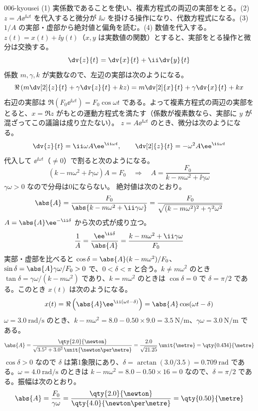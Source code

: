 \documentclass[uplatex,dvipdfmx,a4paper,11pt]{jsarticle}
\begin{document}
\begin{kaisetsu}{006-kyousei}
\houshin (1) 実係数であることを使い、複素方程式の両辺の実部をとる。(2) $z=A\ee^{\ii\omega t}$ を代入すると微分が $\ii\omega$ を掛ける操作になり、代数方程式になる。(3) $1/A$ の実部・虚部から絶対値と偏角を読む。(4) 数値を代入する。
\keisan {} $z(t)=x(t)+\ii y(t)$（$x,y$ は実数値の関数）とすると、実部をとる操作と微分は交換する。
\[ \dv{z}{t}=\dv{x}{t}+\ii\dv{y}{t} \]
係数 $m,\gamma,k$ が実数なので、左辺の実部は次のようになる。
\[ \Re\left(m\dv[2]{z}{t}+\gamma\dv{z}{t}+kz\right)=m\dv[2]{x}{t}+\gamma\dv{x}{t}+kx \]
右辺の実部は $\Re(F_{0}\ee^{\ii\omega t})=F_{0}\cos\omega t$ である。よって複素方程式の両辺の実部をとると、$x=\Re z$ がもとの運動方程式を満たす（係数が複素数なら、実部に $y$ が混ざってこの議論は成り立たない）。
 $z=A\ee^{\ii\omega t}$ のとき、微分は次のようになる。
\[ \dv{z}{t}=\ii\omega A\ee^{\ii\omega t},\qquad \dv[2]{z}{t}=-\omega^{2}A\ee^{\ii\omega t} \]
代入して $\ee^{\ii\omega t}$（$\neq0$）で割ると次のようになる。
\[ (k-m\omega^{2}+\ii\gamma\omega)A=F_{0}\quad\Longrightarrow\quad A=\frac{F_{0}}{k-m\omega^{2}+\ii\gamma\omega} \]
$\gamma\omega>0$ なので分母は0にならない。
 絶対値は次のとおり。
\[ \abs{A}=\frac{F_{0}}{\abs{k-m\omega^{2}+\ii\gamma\omega}}=\frac{F_{0}}{\sqrt{(k-m\omega^{2})^{2}+\gamma^{2}\omega^{2}}} \]
$A=\abs{A}\ee^{-\ii\delta}$ から次の式が成り立つ。
\[ \frac{1}{A}=\frac{\ee^{\ii\delta}}{\abs{A}}=\frac{k-m\omega^{2}+\ii\gamma\omega}{F_{0}} \]
実部・虚部を比べると $\cos\delta=\abs{A}(k-m\omega^{2})/F_{0}$、$\sin\delta=\abs{A}\gamma\omega/F_{0}>0$ で、$0<\delta<\pi$ と合う。$k\neq m\omega^{2}$ のとき $\tan\delta=\gamma\omega/(k-m\omega^{2})$ であり、$k=m\omega^{2}$ のときは $\cos\delta=0$ で $\delta=\pi/2$ である。このとき $x(t)$ は次のようになる。
\[ x(t)=\Re\left(\abs{A}\ee^{\ii(\omega t-\delta)}\right)=\abs{A}\cos(\omega t-\delta) \]
 $\omega=\qty{3.0}{\radian\per\second}$ のとき、$k-m\omega^{2}=8.0-0.50\times9.0=\qty{3.5}{\newton\per\metre}$、$\gamma\omega=\qty{3.0}{\newton\per\metre}$ である。
\[ \abs{A}=\frac{\qty{2.0}{\newton}}{\sqrt{3.5^{2}+3.0^{2}}\,\unit{\newton\per\metre}}=\frac{2.0}{\sqrt{21.25}}\,\unit{\metre}=\qty{0.434}{\metre} \]
$\cos\delta>0$ なので $\delta$ は第1象限にあり、$\delta=\arctan(3.0/3.5)=\qty{0.709}{\radian}$ である。$\omega=\qty{4.0}{\radian\per\second}$ のときは $k-m\omega^{2}=8.0-0.50\times16=0$ なので、$\delta=\pi/2$ である。振幅は次のとおり。
\[ \abs{A}=\frac{F_{0}}{\gamma\omega}=\frac{\qty{2.0}{\newton}}{\qty{4.0}{\newton\per\metre}}=\qty{0.50}{\metre} \]

\end{kaisetsu}
\end{document}
